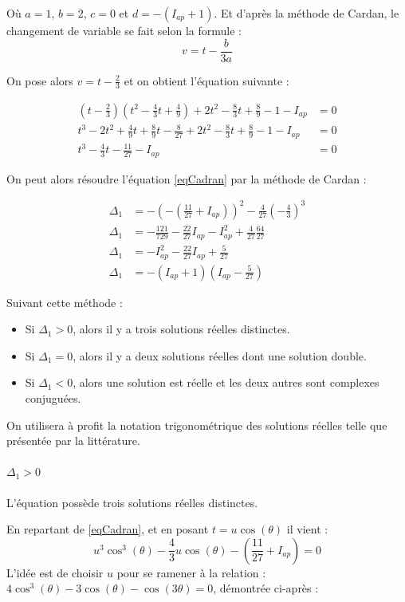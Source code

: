 \documentclass[12pt,a4paper,onecolumn]{article}
\begin{document}
Où $a = 1$, $b = 2$, $c = 0$ et $d = -(I_{ap} + 1)$.
Et d'après la méthode de Cardan, le changement de variable se fait selon la formule : $$ v=t-\frac{b}{3a} $$

On pose alors $v = t - \frac{2}{3}$ et on obtient l'équation suivante :

\begin{align}
\left(t - \frac{2}{3}\right)\left(t^2 - \frac{4}{3}t + \frac{4}{9}\right) + 2t^2 - \frac{8}{3}t + \frac{8}{9} - 1 - I_{ap} &= 0 \nonumber\\
t^3 - 2t^2 + \frac{4}{9}t + \frac{8}{9}t - \frac{8}{27} +2t^2 - \frac{8}{3}t + \frac{8}{9} - 1 - I_{ap} &= 0 \nonumber\\
t^3 - \frac{4}{3}t - \frac{11}{27} - I_{ap} &= 0 \label{eqCadran}
\end{align}

On peut alors résoudre l'équation \ref{eqCadran} par la méthode de Cardan :

\begin{align}
\Delta_1 &= -\left(-\left(\frac{11}{27} + I_{ap}\right)\right)^2 - \frac{4}{27}\left(-\frac{4}{3}\right)^3 \nonumber\\
\Delta_1 &= -\frac{121}{729} - \frac{22}{27}I_{ap} - I_{ap}^2 + \frac{4}{27}\frac{64}{27} \nonumber\\
\Delta_1 &= -I_{ap}^2 - \frac{22}{27}I_{ap} + \frac{5}{27} \nonumber\\
\Delta_1 &= -(I_{ap} + 1)(I_{ap} - \frac{5}{27})
\end{align}

\newpage

Suivant cette méthode :
\begin{itemize}
\item Si $\Delta_1 > 0$, alors il y a trois solutions réelles distinctes.
\item Si $\Delta_1 = 0$, alors il y a deux solutions réelles dont une solution double.
\item Si $\Delta_1 < 0$, alors une solution est réelle et les deux autres sont complexes conjuguées.
\end{itemize}
On utilisera à profit la notation trigonométrique des solutions réelles telle que présentée par la littérature.

\paragraph{$\Delta_1 > 0$} L'équation possède trois solutions réelles distinctes.


En repartant de \ref{eqCadran}, et en posant $t = u\cos(\theta)$ il vient :
\begin{equation}
u^3\cos^3(\theta) -\frac{4}{3}u\cos(\theta)-\left(\frac{11}{27} + I_{ap}\right) = 0
\label{equcos}
\end{equation}
L'idée est de choisir $u$ pour se ramener à la relation :
$ 4\cos^3(\theta) - 3\cos(\theta)-\cos(3\theta) = 0 $, démontrée ci-après :
\end{document}
